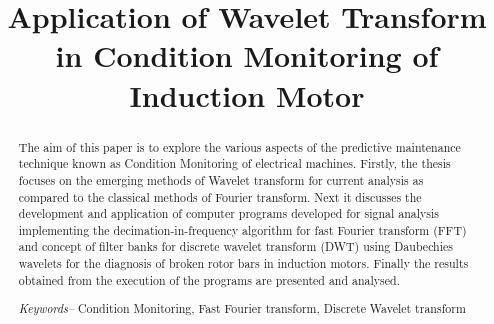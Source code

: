 \documentclass[conference]{IEEEtran}
\begin{document}
\title{Application of Wavelet Transform in Condition Monitoring of Induction Motor}

\author{
\authorblockA{}
\and
{}
\authorblockA{}
\and
{}
\authorblockA{}
}


% 


\maketitle

\begin{abstract}
The aim of this paper is to explore the various aspects of the predictive maintenance technique known as Condition Monitoring of electrical machines. Firstly, the thesis focuses on the emerging methods of Wavelet transform for current analysis as compared to the classical methods of Fourier transform. Next it discusses the development and application of computer programs developed for signal analysis implementing the decimation-in-frequency algorithm for fast Fourier transform (FFT) and concept of filter banks for discrete wavelet transform (DWT) using Daubechies wavelets for the diagnosis of broken rotor bars in induction motors. Finally the results obtained from the execution of the programs are presented and analysed.

\textit{Keywords--} Condition Monitoring, Fast Fourier transform, Discrete Wavelet transform
\end{abstract}
\end{document}
